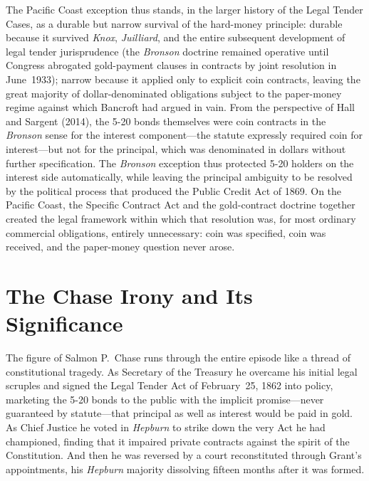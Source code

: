 \documentclass[12pt]{article}
\begin{document}
The Pacific Coast exception thus stands, in the larger history of the Legal
Tender Cases, as a durable but narrow survival of the hard-money principle:
durable because it survived \textit{Knox}, \textit{Juilliard}, and the
entire subsequent development of legal tender jurisprudence (the
\textit{Bronson} doctrine remained operative until Congress abrogated
gold-payment clauses in contracts by joint resolution in June~1933); narrow
because it applied only to explicit coin contracts, leaving the great
majority of dollar-denominated obligations subject to the paper-money regime
against which Bancroft had argued in vain.  From the perspective of Hall and
Sargent (2014), the 5-20 bonds themselves were coin contracts in the
\textit{Bronson} sense for the interest component---the statute expressly
required coin for interest---but not for the principal, which was
denominated in dollars without further specification.  The \textit{Bronson}
exception thus protected 5-20 holders on the interest side automatically,
while leaving the principal ambiguity to be resolved by the political
process that produced the Public Credit Act of 1869.  On the Pacific Coast,
the Specific Contract Act and the gold-contract doctrine together created
the legal framework within which that resolution was, for most ordinary
commercial obligations, entirely unnecessary: coin was specified, coin was
received, and the paper-money question never arose.

\section{The Chase Irony and Its Significance}

The figure of Salmon P.\ Chase runs through the entire episode like a
thread of constitutional tragedy. As Secretary of the Treasury he
overcame his initial legal scruples and signed the Legal Tender Act of
February~25, 1862 into policy, marketing the 5-20 bonds to the public
with the implicit promise---never guaranteed by statute---that principal
as well as interest would be paid in gold. As Chief Justice he voted
in \textit{Hepburn} to strike down the very Act he had championed,
finding that it impaired private contracts against the spirit of the
Constitution. And then he was reversed by a court reconstituted through
Grant's appointments, his \textit{Hepburn} majority dissolving fifteen
months after it was formed.
\end{document}
